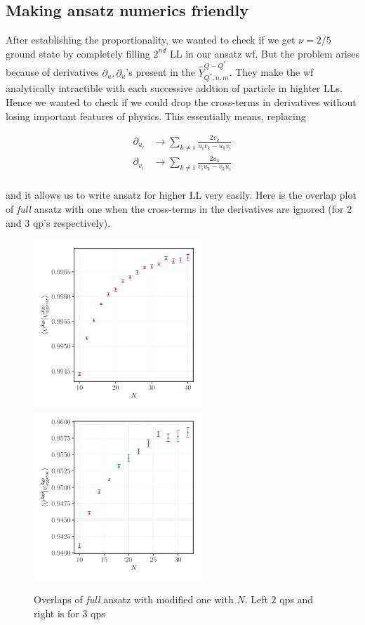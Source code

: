 \documentclass[11pt,a4paper,notitlepage]{article}
\begin{document}
	\subsection{Making ansatz numerics friendly}
	After establishing the proportionality, we wanted to check if we get $\nu=2/5$ ground state by completely filling $2^{nd}$ LL in our ansatz wf. But the problem arises because of derivatives $\partial_{u}, \partial_{u}$'s present in the $\hat{Y}^{Q-Q^{*}}_{Q^{*},n,m}$. They make the wf analytically intractible with each successive addtion of particle in highter LLs. Hence we wanted to check if we could drop the cross-terms in derivatives without losing important features of physics. This essentially means, replacing 
	
	\begin{align*}
		\partial_{u_i} &\rightarrow \sum_{k\neq i} \frac{2 v_k}{u_i v_k - u_k v_i} \\
		\partial_{v_i} &\rightarrow \sum_{k\neq i} \frac{2 u_k}{v_i u_k - v_k u_i} \\
 	\end{align*}
 	
 	and it allows us to write ansatz for higher LL very easily. Here is the overlap plot of \textit{full} ansatz with one when the cross-terms in the derivatives are ignored (for $2$ and $3$ qp's respectively).
 	
 	 \begin{figure}[h]
		\centering
		\includegraphics[width=2.5in]{figures/2QP_overlap_with_partcles.pdf}
		\includegraphics[width=2.5in]{figures/3QP_overlap_with_partcles.pdf}
		\caption{Overlaps of \textit{full} ansatz with modified one with $N$. Left $2$ qps and right is for $3$ qps}
	\end{figure}
	
\end{document}
